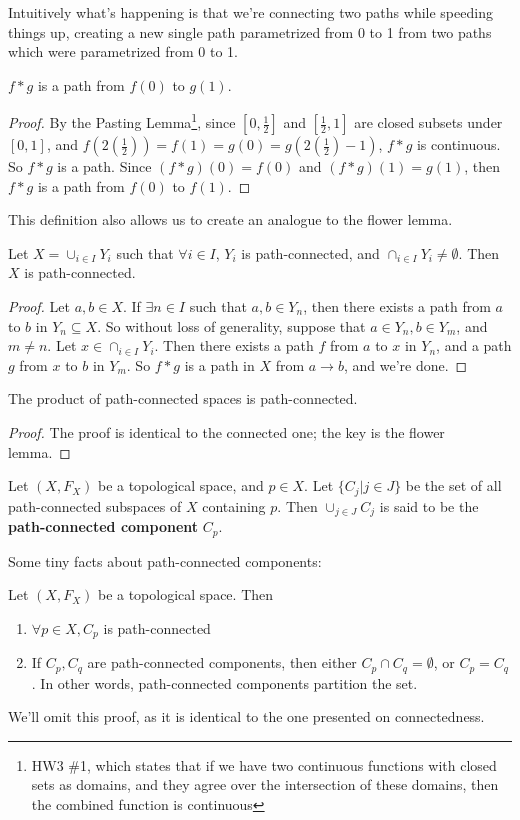 Intuitively what's happening is that we're connecting two paths while speeding things up, creating a new single path parametrized from 0 to 1 from two paths which were parametrized from 0 to 1.
\begin{smallfact}
$f\ast g$ is a path from $f(0)$ to $g(1)$. 
\end{smallfact}
\begin{proof}
By the Pasting Lemma\footnote{HW3 \#1, which states that if we have two continuous functions with closed sets as domains, and they agree over the intersection of these domains, then the combined function is continuous}, since $[0,\frac{1}{2}]$ and $[\frac{1}{2},1]$ are closed subsets under $[0,1]$, and $f(2 (\frac{1}{2} )) = f(1) = g(0) = g(2 (\frac{1}{2}) - 1 )$, $f\ast g$ is continuous. So $f\ast g$ is a path. Since $(f\ast g)(0) = f(0)$ and $(f\ast g) (1) = g(1)$, then $f\ast g$ is a path from $f(0)$ to $f(1)$. 
\end{proof}

This definition also allows us to create an analogue to the flower lemma. 
\begin{theorem}
 Let $X = \cup_{i\in I} Y_i$ such that $\forall i\in I$, $Y_i$ is path-connected, and $\cap_{i\in I} Y_i \neq \emptyset$. Then $X$ is path-connected. 
\end{theorem}
\begin{proof}
Let $a,b\in X$. If $\exists n\in I$ such that $a,b\in Y_n$, then there exists a path from $a$ to $b$ in $Y_n\subseteq X$. So without loss of generality, suppose that $a\in Y_n, b\in Y_m$, and $m\neq n$. Let $x\in \cap_{i\in I} Y_i$. Then there exists a path $f$ from $a$ to $x$ in $Y_n$, and a path $g$ from $x$ to $b$ in $Y_m$. So $f\ast g$ is a path in $X$ from $a \to b$, and we're done. 
\end{proof}
\begin{corollary}
The product of path-connected spaces is path-connected. 
\end{corollary}
\begin{proof}
The proof is identical to the connected one; the key is the flower lemma. 
\end{proof}
\begin{definition}
Let $(X,F_X)$ be a topological space, and $p\in X$. Let $\{C_j | j\in J\}$ be the set of all path-connected subspaces of $X$ containing $p$. Then $\cup_{j\in J} C_j$ is said to be the \textbf{path-connected component} $C_p$. 
\end{definition}

Some tiny facts about path-connected components:

Let $(X,F_X)$ be a topological space. Then 
\begin{enumerate}
\item $\forall p\in X, C_p$ is path-connected 
\item If $C_p, C_q$ are path-connected components, then either $C_p \cap C_q = \emptyset$, or $C_p = C_q$. In other words, path-connected components partition the set. 
\end{enumerate}
We'll omit this proof, as it is identical to the one presented on connectedness. 
